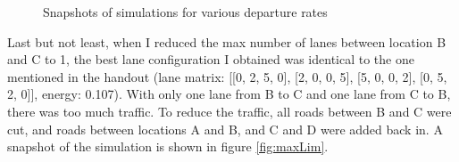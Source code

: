 \documentclass[11pt]{article}
\begin{document}
\begin{figure}[H]
    \qquad
	\qquad
	\qquad
    \caption{Snapshots of simulations for various departure rates}%
    \label{fig:departFig}%
\end{figure}

Last but not least, when I reduced the max number of lanes between location B and C to 1, the best lane configuration I obtained was identical to the one mentioned in the handout (lane matrix: [[0, 2, 5, 0], [2, 0, 0, 5], [5, 0, 0, 2], [0, 5, 2, 0]], energy: 0.107). With only one lane from B to C and one lane from C to B, there was too much traffic. To reduce the traffic, all roads between B and C were cut, and roads between locations A and B, and C and D were added back in. A snapshot of the simulation is shown in figure \ref{fig:maxLim}.
\end{document}
